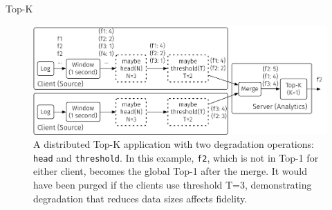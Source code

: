 \begin{frame}{Top-K}
  \centering
  \begin{figure}
    \centering
    \includegraphics[width=\linewidth]{figures/topk.pdf}
    \caption{A distributed Top-K application with two degradation operations:
      \texttt{head} and \texttt{threshold}. In this example, \texttt{f2}, which
      is not in Top-1 for either client, becomes the global Top-1 after the
      merge. It would have been purged if the clients use threshold T=3,
      demonstrating degradation that reduces data sizes affects fidelity.}
    \label{fig:topk}
    \vspace{-0.5em}
  \end{figure}
\end{frame}

